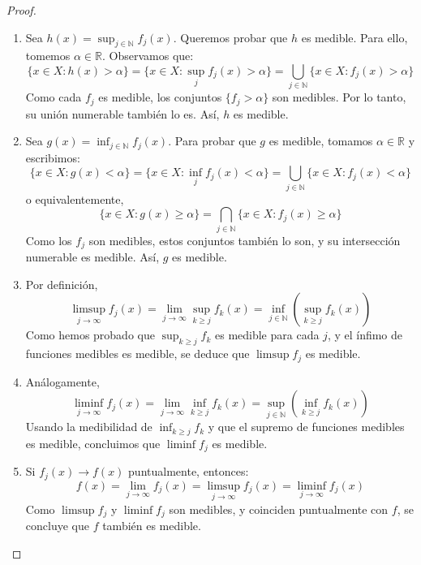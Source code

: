 \begin{proof}
    \leavevmode
    \begin{enumerate}
        \item Sea $h(x) = \sup_{j \in \mathbb{N}} f_j(x)$. Queremos probar que $h$ es
              medible. Para ello, tomemos $\alpha \in \mathbb{R}$. Observamos que:
              \[
                  \{ x \in X : h(x) > \alpha \} = \{ x \in X : \sup_j f_j(x) > \alpha \} = \bigcup_{j \in \mathbb{N}} \{ x \in X : f_j(x) > \alpha \}
              \]
              Como cada $f_j$ es medible, los conjuntos $\{ f_j > \alpha \}$ son medibles.
              Por lo tanto, su unión numerable también lo es. Así, $h$ es medible.

        \item Sea $g(x) = \inf_{j \in \mathbb{N}} f_j(x)$. Para probar que $g$ es medible,
              tomamos $\alpha \in \mathbb{R}$ y escribimos:
              \[
                  \{ x \in X : g(x) < \alpha \} = \{ x \in X : \inf_j f_j(x) < \alpha \} = \bigcup_{j \in \mathbb{N}} \{ x \in X : f_j(x) < \alpha \}
              \]
              o equivalentemente,
              \[
                  \{ x \in X : g(x) \geq \alpha \} = \bigcap_{j \in \mathbb{N}} \{ x \in X : f_j(x) \geq \alpha \}
              \]
              Como los $f_j$ son medibles, estos conjuntos también lo son, y su intersección
              numerable es medible. Así, $g$ es medible.

        \item Por definición,
              \[
                  \limsup_{j \to \infty} f_j(x) = \lim_{j \to \infty} \sup_{k \geq j} f_k(x) = \inf_{j \in \mathbb{N}} \left( \sup_{k \geq j} f_k(x) \right)
              \]
              Como hemos probado que $\sup_{k \geq j} f_k$ es medible para cada $j$, y el
              ínfimo de funciones medibles es medible, se deduce que $\limsup f_j$ es
              medible.

        \item Análogamente,
              \[
                  \liminf_{j \to \infty} f_j(x) = \lim_{j \to \infty} \inf_{k \geq j} f_k(x) = \sup_{j \in \mathbb{N}} \left( \inf_{k \geq j} f_k(x) \right)
              \]
              Usando la medibilidad de $\inf_{k \geq j} f_k$ y que el supremo de funciones
              medibles es medible, concluimos que $\liminf f_j$ es medible.

        \item Si $f_j(x) \to f(x)$ puntualmente, entonces:
              \[
                  f(x) = \lim_{j \to \infty} f_j(x) = \limsup_{j \to \infty} f_j(x) = \liminf_{j \to \infty} f_j(x)
              \]
              Como $\limsup f_j$ y $\liminf f_j$ son medibles, y coinciden puntualmente con
              $f$, se concluye que $f$ también es medible.
    \end{enumerate}
\end{proof}

